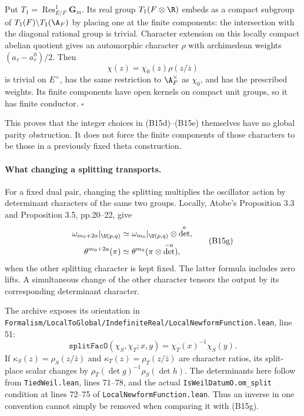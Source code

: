 Put $T_1=\operatorname{Res}^{1}_{E/F}\mathbf G_m$. Its real group $T_1(F\otimes\R)$ embeds as a compact subgroup of $T_1(F)\backslash T_1(\A_F)$ by placing one at the finite components: the intersection with the diagonal rational group is trivial. Character extension on this locally compact abelian quotient gives an automorphic character $\rho$ with archimedean weights $(a_\tau-a^0_\tau)/2$. Then
\[
 \chi(z)=\chi_0(z)\rho(z/\overline z)
\]
is trivial on $E^\times$, has the same restriction to $\A_F^\times$ as $\chi_0$, and has the prescribed weights. Its finite components have open kernels on compact unit groups, so it has finite conductor. \hfill$\square$

This proves that the integer choices in (B15d)--(B15e) themselves have no global parity obstruction. It does not force the finite components of those characters to be those in a previously fixed theta construction.

\paragraph{What changing a splitting transports.}
For a fixed dual pair, changing the splitting multiplies the oscillator action by determinant characters of the same two groups. Locally, Atobe's Proposition 3.3 and Proposition 3.5, pp.20--22, give
\begin{equation}
\begin{aligned}
 \omega_{m_0+2a}|_{\U(p,q)}
       &\simeq\omega_{m_0}|_{\U(p,q)}\otimes\det^a,\\
 \theta^{m_0+2a}(\pi)
       &\simeq\theta^{m_0}(\pi\otimes\det^{-a}),
\end{aligned}
 \tag{B15g}
\end{equation}
when the other splitting character is kept fixed. The latter formula includes zero lifts. A simultaneous change of the other character tensors the output by its corresponding determinant character.

The archive exposes its orientation in
\texttt{Formalism/\allowbreak{}LocalToGlobal/\allowbreak{}IndefiniteReal/\allowbreak{}LocalNewformFunction.lean}, line 51:
\[
 \texttt{splitFacO}(\chi_S,\chi_T;x,y)=\chi_T(x)^{-1}\chi_S(y).
 \tag{B15h}
\]
If $\kappa_S(z)=\rho_S(z/\bar z)$ and $\kappa_T(z)=\rho_T(z/\bar z)$ are character ratios, its split-place scalar changes by
$\rho_T(\det g)^{-1}\rho_S(\det h)$.
The determinants here follow from \texttt{TiedWeil.lean}, lines 71--78, and the actual \texttt{IsWeilDatumO.om\_split} condition at lines 72--75 of \texttt{LocalNewformFunction.lean}. Thus an inverse in one convention cannot simply be removed when comparing it with (B15g).

